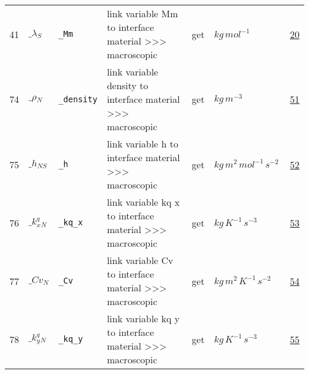 \begin{longtable}{|p{1cm}|p{2.5cm}|p{4.5cm}|p{8cm}|p{3.0cm}|p{3cm}|p{1cm}|}
            41
             & \hypertarget{"v:41"}{ $ {\_\lambda}{_{S}} $}
             & \verb|_Mm|
             & link variable Mm to interface material >>> macroscopic
             & \begin{lay}get \end{lay}
             & $ kg \,mol^{-1} \, $
             &                 \hyperlink{"e:20"}{ 20 }
                 \\
            74
             & \hypertarget{"v:74"}{ $ {\_\rho}{_{N}} $}
             & \verb|_density|
             & link variable density to interface material >>> macroscopic
             & \begin{lay}get \end{lay}
             & $ kg \,m^{-3} \, $
             &                 \hyperlink{"e:51"}{ 51 }
                 \\
            75
             & \hypertarget{"v:75"}{ $ {\_h}{_{{N S}}} $}
             & \verb|_h|
             & link variable h to interface material >>> macroscopic
             & \begin{lay}get \end{lay}
             & $ kg \,m^{2} \,mol^{-1} \,s^{-2} \, $
             &                 \hyperlink{"e:52"}{ 52 }
                 \\
            76
             & \hypertarget{"v:76"}{ $ {{\_k^q_x}}{_{N}} $}
             & \verb|_kq_x|
             & link variable kq x to interface material >>> macroscopic
             & \begin{lay}get \end{lay}
             & $ kg \,K^{-1} \,s^{-3} \, $
             &                 \hyperlink{"e:53"}{ 53 }
                 \\
            77
             & \hypertarget{"v:77"}{ $ {{\_Cv}}{_{N}} $}
             & \verb|_Cv|
             & link variable Cv to interface material >>> macroscopic
             & \begin{lay}get \end{lay}
             & $ kg \,m^{2} \,K^{-1} \,s^{-2} \, $
             &                 \hyperlink{"e:54"}{ 54 }
                 \\
            78
             & \hypertarget{"v:78"}{ $ {{\_k^q_y}}{_{N}} $}
             & \verb|_kq_y|
             & link variable kq y to interface material >>> macroscopic
             & \begin{lay}get \end{lay}
             & $ kg \,K^{-1} \,s^{-3} \, $
             &                 \hyperlink{"e:55"}{ 55 }

\end{longtable}
